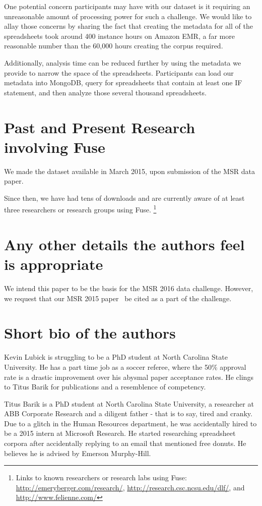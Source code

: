 \documentclass[conference]{IEEEtran}
\begin{document}
One potential concern participants may have with our dataset is it requiring an unreasonable amount of processing power for such a challenge.
We would like to allay those concerns by sharing the fact that creating the metadata for all of the spreadsheets took around 400 instance hours on Amazon EMR, a far more reasonable number than the 60,000 hours creating the corpus required.

Additionally, analysis time can be reduced further by using the metadata we provide to narrow the space of the spreadsheets.
Participants can load our metadata into MongoDB, query for spreadsheets that contain at least one IF statement, and then analyze those several thousand spreadsheets.

\section{Past and Present Research involving Fuse}
We made the dataset available in March 2015, upon submission of the MSR data paper.  

Since then, we have had tens of downloads and are currently aware of at least three researchers or research groups using Fuse.  
\footnote{Links to known researchers or research labs using Fuse: \url{http://emeryberger.com/research/}, \url{http://research.csc.ncsu.edu/dlf/}, and \url{http://www.felienne.com/}}




\section{Any other details the authors feel is appropriate}
We intend this paper to be the basis for the MSR 2016 data challenge.  
However, we request that our MSR 2015 paper~\cite{barik2015} be cited as a part of the challenge.


\section{Short bio of the authors}

Kevin Lubick is struggling to be a PhD student at North Carolina State University.  He has a part time job as a soccer referee, where the 50\% approval rate is a drastic improvement over his abysmal paper acceptance rates.  He clings to Titus Barik for publications and a resemblence of competency.

Titus Barik is a PhD student at North Carolina State University, a researcher at ABB Corporate Research and a diligent father - that is to say, tired and cranky.  Due to a glitch in the Human Resources department, he was accidentally hired to be a 2015 intern at Microsoft Research.  He started researching spreadsheet corpora after accidentally replying to an email that mentioned free donuts.  He believes he is advised by Emerson Murphy-Hill.
\end{document}

